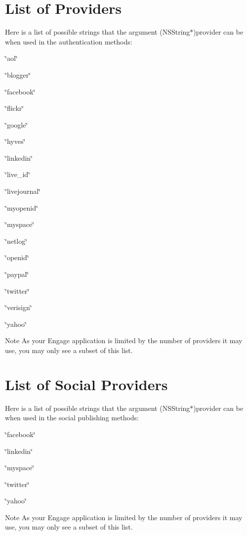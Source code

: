 \hypertarget{_providers_basicProviders}{}\section{List of Providers}\label{_providers_basicProviders}
Here is a list of possible strings that the argument (NSString$\ast$)provider can be when used in the authentication methods:
\begin{DoxyItemize}
\item \char`\"{}aol\char`\"{}
\item \char`\"{}blogger\char`\"{}
\item \char`\"{}facebook\char`\"{}
\item \char`\"{}flickr\char`\"{}
\item \char`\"{}google\char`\"{}
\item \char`\"{}hyves\char`\"{}
\item \char`\"{}linkedin\char`\"{}
\item \char`\"{}live\_\-id\char`\"{}
\item \char`\"{}livejournal\char`\"{}
\item \char`\"{}myopenid\char`\"{}
\item \char`\"{}myspace\char`\"{}
\item \char`\"{}netlog\char`\"{}
\item \char`\"{}openid\char`\"{}
\item \char`\"{}paypal\char`\"{}
\item \char`\"{}twitter\char`\"{}
\item \char`\"{}verisign\char`\"{}
\item \char`\"{}yahoo\char`\"{}
\end{DoxyItemize}

\begin{DoxyNote}{Note}
As your Engage application is limited by the number of providers it may use, you may only see a subset of this list.
\end{DoxyNote}
\hypertarget{_providers_socialProviders}{}\section{List of Social Providers}\label{_providers_socialProviders}
Here is a list of possible strings that the argument (NSString$\ast$)provider can be when used in the social publishing methods:
\begin{DoxyItemize}
\item \char`\"{}facebook\char`\"{}
\item \char`\"{}linkedin\char`\"{}
\item \char`\"{}myspace\char`\"{}
\item \char`\"{}twitter\char`\"{}
\item \char`\"{}yahoo\char`\"{}
\end{DoxyItemize}

\begin{DoxyNote}{Note}
As your Engage application is limited by the number of providers it may use, you may only see a subset of this list. 
\end{DoxyNote}
